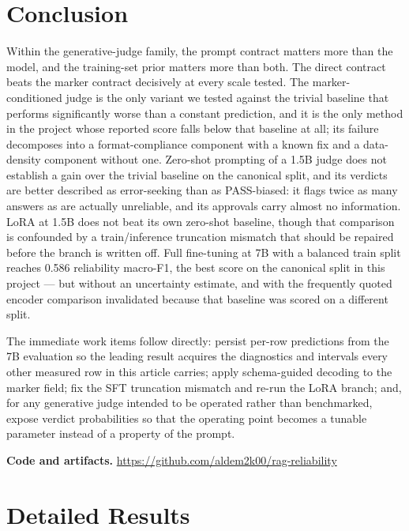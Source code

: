 \documentclass{zapiski}
\begin{document}
\section{Conclusion}
\label{sec:conclusion}

Within the generative-judge family, the prompt contract matters more than the
model, and the training-set prior matters more than both. The direct contract
beats the marker contract decisively at every scale tested. The
marker-conditioned judge is the only variant we tested against the trivial
baseline that performs significantly worse than a constant prediction, and it
is the only method in the project whose reported score falls below that
baseline at all; its failure decomposes
into a format-compliance component with a known fix and a data-density
component without one. Zero-shot prompting of a 1.5B judge does not establish
a gain over the trivial baseline on the canonical split, and its verdicts are
better described as error-seeking than as PASS-biased: it flags twice as many
answers as are actually unreliable, and its approvals carry almost no
information. LoRA at 1.5B does not beat its own zero-shot baseline, though
that comparison is confounded by a train/inference truncation mismatch that
should be repaired before the branch is written off. Full fine-tuning at 7B
with a balanced train split reaches 0.586 reliability macro-F1, the best score
on the canonical split in this project --- but without an uncertainty
estimate, and with the frequently quoted encoder comparison invalidated
because that baseline was scored on a different split.

The immediate work items follow directly: persist per-row predictions from the
7B evaluation so the leading result acquires the diagnostics and intervals
every other measured row in this article carries; apply schema-guided decoding
to the marker field; fix the SFT truncation mismatch and re-run the LoRA
branch; and, for any generative judge intended to be operated rather than
benchmarked, expose verdict probabilities so that the operating point becomes
a tunable parameter instead of a property of the prompt.

\medskip
\noindent\textbf{Code and artifacts.}
\url{https://github.com/aldem2k00/rag-reliability}

\clearpage
\appendix
\section{Detailed Results}
\label{sec:appendix-results}
\end{document}

